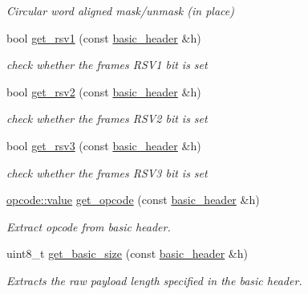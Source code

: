 \begin{DoxyCompactItemize}
\begin{DoxyCompactList}\small\item\em Circular word aligned mask/unmask (in place) \end{DoxyCompactList}\item 
bool \hyperlink{namespacewebsocketpp_1_1frame_a90556de9dd71c1f063153b791abeb81c}{get\+\_\+rsv1} (const \hyperlink{structwebsocketpp_1_1frame_1_1basic__header}{basic\+\_\+header} \&h)
\begin{DoxyCompactList}\small\item\em check whether the frame\textquotesingle{}s R\+S\+V1 bit is set \end{DoxyCompactList}\item 
bool \hyperlink{namespacewebsocketpp_1_1frame_a531509bc14ee0a6641662b17d5670460}{get\+\_\+rsv2} (const \hyperlink{structwebsocketpp_1_1frame_1_1basic__header}{basic\+\_\+header} \&h)
\begin{DoxyCompactList}\small\item\em check whether the frame\textquotesingle{}s R\+S\+V2 bit is set \end{DoxyCompactList}\item 
bool \hyperlink{namespacewebsocketpp_1_1frame_a4dc0cc35b38986b9b56120ef297dd795}{get\+\_\+rsv3} (const \hyperlink{structwebsocketpp_1_1frame_1_1basic__header}{basic\+\_\+header} \&h)
\begin{DoxyCompactList}\small\item\em check whether the frame\textquotesingle{}s R\+S\+V3 bit is set \end{DoxyCompactList}\item 
\hyperlink{namespacewebsocketpp_1_1frame_1_1opcode_ae68711643096dfc4af6d66ade3f9fd5e}{opcode\+::value} \hyperlink{namespacewebsocketpp_1_1frame_a235192baaf86f38158dc33f178c04661}{get\+\_\+opcode} (const \hyperlink{structwebsocketpp_1_1frame_1_1basic__header}{basic\+\_\+header} \&h)
\begin{DoxyCompactList}\small\item\em Extract opcode from basic header. \end{DoxyCompactList}\item 
uint8\+\_\+t \hyperlink{namespacewebsocketpp_1_1frame_a2ceb63e6a2fe19964d13363ba2bb9e15}{get\+\_\+basic\+\_\+size} (const \hyperlink{structwebsocketpp_1_1frame_1_1basic__header}{basic\+\_\+header} \&h)
\begin{DoxyCompactList}\small\item\em Extracts the raw payload length specified in the basic header. \end{DoxyCompactList}\item 

\end{DoxyCompactItemize}
